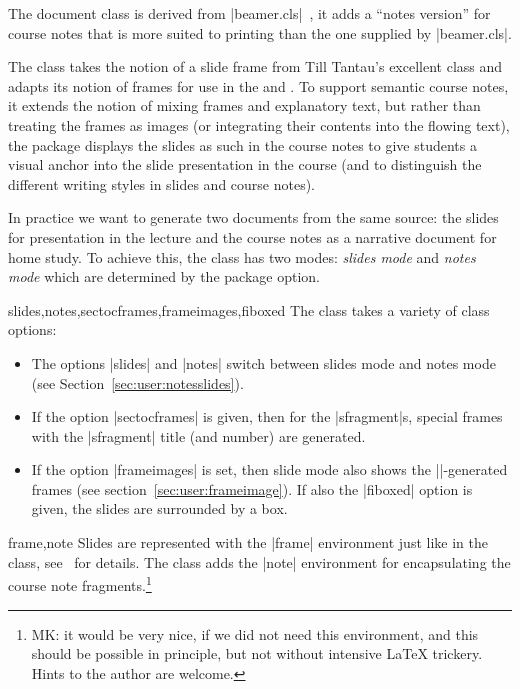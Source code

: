 The  document class is derived from |beamer.cls|~\cite{beamerclass:on},
it adds a ``notes version'' for course notes that is more suited to printing than the one
supplied by |beamer.cls|.

The  class takes the notion of a slide frame from Till Tantau's excellent
 class and adapts its notion of frames for use in the \sTeX and \omdoc. To
support semantic course notes, it extends the notion of mixing frames and explanatory
text, but rather than treating the frames as images (or integrating their contents into
the flowing text), the  package displays the slides as such in the course
notes to give students a visual anchor into the slide presentation in the course (and to
distinguish the different writing styles in slides and course notes).

In practice we want to generate two documents from the same source: the slides for
presentation in the lecture and the course notes as a narrative document for home
study. To achieve this, the  class has two modes: \emph{slides mode} and
\emph{notes mode} which are determined by the package option. 


\begin{variable}{slides,notes,sectocframes,frameimages,fiboxed}
  The  class takes a variety of class options: 
  \begin{itemize}
  \item The options |slides| and |notes| switch between slides mode and notes mode (see
    Section~\ref{sec:user:notesslides}).
  \item If the option |sectocframes| is given, then for the |sfragment|s, special frames
    with the |sfragment| title (and number) are generated.
  \item If the option |frameimages| is set, then slide mode also shows the
    |\frameimage|-generated frames (see section~\ref{sec:user:frameimage}). If also the
    |fiboxed| option is given, the slides are surrounded by a box.
  \end{itemize}
\end{variable}

\begin{environment}{frame,note}
  Slides are represented with the |frame| environment just like in the  class,
  see~\cite{Tantau:ugbc} for details. The  class adds the |note|
  environment for encapsulating the course note fragments.\footnote{MK: it would be very
    nice, if we did not need this environment, and this should be possible in principle,
    but not without intensive LaTeX trickery. Hints to the author are welcome.}
\end{environment}
  
